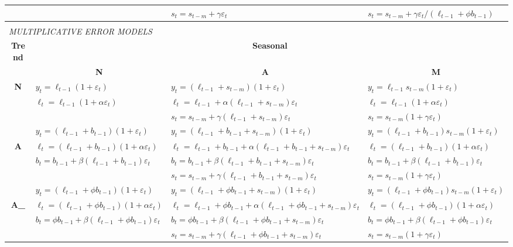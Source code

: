 \documentclass[11pt,a4paper]{article}
\def\damped{_\text{d}}
\begin{document}
\begin{small}
\begin{tabular}{clll}
    &
    & $s_t =  s_{t-m} + \gamma  \varepsilon_t$
    & $s_t =  s_{t-m} + \gamma  \varepsilon_t/(\ell_{t-1}+\phi
    b_{t-1})$
\\
\bottomrule\\
\multicolumn{4}{l}{\it MULTIPLICATIVE ERROR MODELS}\\
\toprule
\bf Trend & \multicolumn{3}{c}{\bf Seasonal} \\
 & \multicolumn{1}{c}{\bf N}
 & \multicolumn{1}{c}{\bf A}
 & \multicolumn{1}{c}{\bf M} \\
\cmidrule{2-4}
{\bf N}
    & $y_{t} = \ell_{t-1}(1 + \varepsilon_t)$
    & $y_{t} = (\ell_{t-1} + s_{t-m})(1 + \varepsilon_t)$
    & $y_{t} = \ell_{t-1} s_{t-m}(1 + \varepsilon_t)$ \\
    & $\ell_t = \ell_{t-1}(1 + \alpha \varepsilon_t)$
    & $\ell_t = \ell_{t-1} + \alpha(\ell_{t-1} + s_{t-m})
    \varepsilon_t$
    & $\ell_t = \ell_{t-1}(1 + \alpha \varepsilon_t)$ \\
    &&$s_t = s_{t-m} + \gamma  (\ell_{t-1} + s_{t-m})\varepsilon_t$
    & $s_t = s_{t-m}(1 + \gamma  \varepsilon_t)$
\\
\midrule
    & $y_{t} = (\ell_{t-1} + b_{t-1})(1 + \varepsilon_t)$
    & $y_{t} = (\ell_{t-1} + b_{t-1} + s_{ t-m})(1 + \varepsilon_t)$
    & $y_{t} = (\ell_{t-1}+b_{t-1})s_{t-m}(1 + \varepsilon_t)$ \\
{\bf A}
    & $\ell_t = (\ell_{t-1} + b_{t-1})(1 + \alpha  \varepsilon_t)$
    & $\ell_t = \ell_{t-1} + b_{t-1} + \alpha (\ell_{t-1} + b_{t-1}+ s_{ t-m}) \varepsilon_t$
    & $\ell_t = (\ell_{t-1} + b_{t-1})(1 + \alpha\varepsilon_t)$ \\
    & $b_t = b_{t-1} + \beta (\ell_{t-1} + b_{t-1}) \varepsilon_t$
    & $b_t = b_{t-1} + \beta (\ell_{t-1} + b_{t-1} + s_{ t-m})\varepsilon_t$
    & $b_t = b_{t-1} + \beta (\ell_{t-1}+b_{t-1})\varepsilon_t$ \\
    &
    & $s_t =  s_{t-m} + \gamma (\ell_{t-1} + b_{t-1} + s_{ t-m})\varepsilon_t$
    & $s_t =  s_{t-m}(1 + \gamma \varepsilon_t)$
\\
\midrule
    & $y_{t} =  (\ell_{t-1} + \phi b_{t-1})(1 + \varepsilon_t)$
    & $y_{t} =  (\ell_{t-1} + \phi b_{t-1} + s_{t-m})(1 + \varepsilon_t)$
    & $y_{t} = (\ell_{t-1} + \phi b_{t-1})s_{t-m}(1 + \varepsilon_t)$ \\
{\bf A\damped }
    & $\ell_t = (\ell_{t-1} + \phi b_{t-1})(1 + \alpha \varepsilon_t)$
    & $\ell_t = \ell_{t-1} + \phi b_{t-1} + \alpha (\ell_{t-1}+ \phi b_{t-1} + s_{t-m}) \varepsilon_t$
    & $\ell_t = (\ell_{t-1} + \phi b_{t-1})(1 + \alpha \varepsilon_t)$ \\
    & $b_t = \phi b_{t-1} + \beta(\ell_{t-1} + \phi b_{t-1})\varepsilon_t$
    & $b_t = \phi b_{t-1} + \beta  (\ell_{t-1} + \phi b_{t-1} +s_{t-m})\varepsilon_t$
    & $b_t = \phi b_{t-1} + \beta (\ell_{t-1} + \phi b_{t-1})\varepsilon_t$ \\
    &
    & $s_t =  s_{t-m} + \gamma (\ell_{t-1} + \phi b_{t-1} + s_{t-m})\varepsilon_t$
    & $s_t =  s_{t-m}(1+ \gamma \varepsilon_t)$
\\
\bottomrule
\end{tabular}\vspace{0.5cm}
\end{small}
\end{document}
